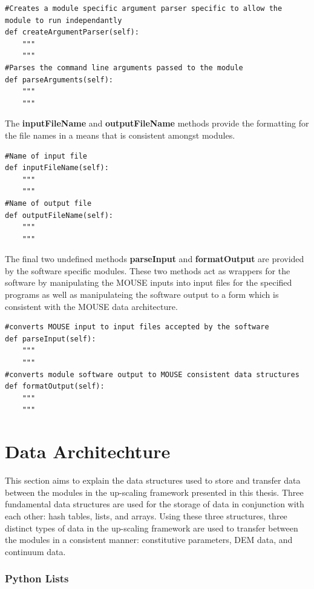 \begin{lstlisting}[frame=single] 
#Creates a module specific argument parser specific to allow the module to run independantly   
def createArgumentParser(self):
	"""
	"""
#Parses the command line arguments passed to the module
def parseArguments(self):
	"""
	"""
\end{lstlisting}

The \textbf{inputFileName} and \textbf{outputFileName} methods provide the formatting for the file names in a means that is consistent amongst modules.

\begin{lstlisting}[frame=single]
#Name of input file
def inputFileName(self):
	"""
	"""
#Name of output file
def outputFileName(self):
	"""
	"""
\end{lstlisting}

The final two undefined methods \textbf{parseInput} and \textbf{formatOutput} are provided by the software specific modules. These two methods act as wrappers for the software by manipulating the MOUSE inputs into input files for the specified programs as well as manipulateing the software output to a form which is consistent with the MOUSE data architecture.

\begin{lstlisting}[frame=single]
#converts MOUSE input to input files accepted by the software
def parseInput(self):
	"""
	"""
#converts module software output to MOUSE consistent data structures
def formatOutput(self):
	"""
	"""
\end{lstlisting}

\section{Data Architechture}

This section aims to explain the data structures used to store and transfer data between the modules in the up-scaling framework presented in this thesis.  Three fundamental data structures are used for the storage of data in conjunction with each other: hash tables, lists, and arrays. Using these three structures, three distinct types of data in the up-scaling framework are used to transfer between the modules in a consistent manner: constitutive parameters, DEM data, and continuum data.

\subsubsection*{Python Lists}

